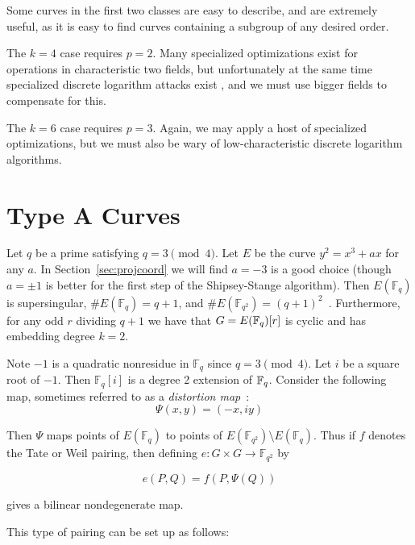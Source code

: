 Some curves in the first two classes are easy to describe, and are
extremely useful, as it is easy to find curves containing a
subgroup of any desired order.

The $k=4$ case requires $p=2$.
Many specialized optimizations exist for
operations in characteristic two fields,
but unfortunately at the same time specialized discrete logarithm attacks
exist \cite{coppersmith}, and we must use bigger fields to compensate for
this. 

The $k=6$ case requires $p=3$. Again, we may apply
a host of specialized optimizations, but we must also be wary of
low-characteristic discrete logarithm algorithms.

\section {Type A Curves}

Let $q$ be a prime satisfying $q = 3 \pmod{4}$.
Let $E$ be the curve $y^2 = x^3 + a x$ for any $a$.
In Section~\ref{sec:projcoord} we will find $a=-3$ is a good choice
(though $a=\pm1$ is better for the first step of the Shipsey-Stange algorithm).
Then
$E(\mathbb{F}_q)$ is supersingular,
$\#E(\mathbb{F}_q) = q+1$, and
$\#E(\mathbb{F}_{q^2}) = (q+1)^2$~\cite[\S 3.2]{fst}.
Furthermore, for any odd $r$ dividing $q + 1$ we have that
$G = E(\mathbb{F}_q)[r]$ is cyclic and has embedding degree $k = 2$.

Note $-1$ is a quadratic nonresidue in $\mathbb{F}_q$ since $q = 3\pmod{4}$.
Let $i$ be a square root of $-1$. Then $\mathbb{F}_q[i]$ is a degree 2
extension of $\mathbb{F}_q$.
Consider the following map, sometimes referred to as a \emph{distortion
map}~\cite{verheul}:
\[ \Psi(x, y) = (-x, i y) \]

Then $\Psi$ maps points of $E(\mathbb{F}_q)$ to points of
$E(\mathbb{F}_{q^2}) \setminus E(\mathbb{F}_q)$. Thus if $f$ denotes the
Tate or Weil pairing, then defining $e:G \times G \rightarrow \mathbb{F}_{q^2}$
by

\[ e(P,Q) = f(P, \Psi(Q)) \]

gives a bilinear nondegenerate map.

This type of pairing can be set up as follows:

